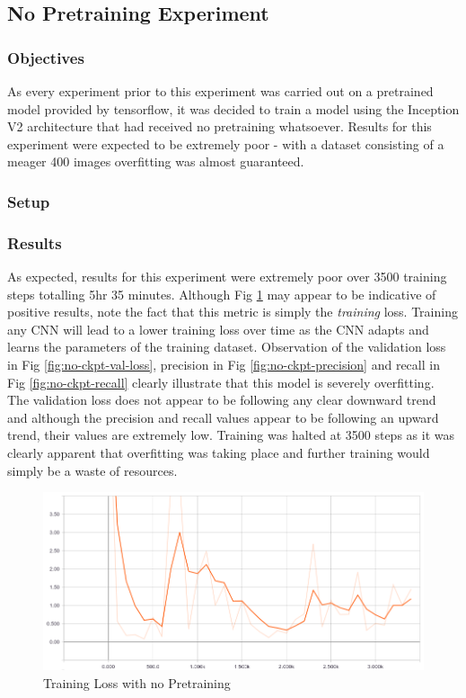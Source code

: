 \documentclass[12pt]{report}
\begin{document}
\newpage
\subsection{No Pretraining Experiment}
\subsubsection{Objectives}
\begin{flushleft}
As every experiment prior to this experiment was carried out on a pretrained model provided by tensorflow, it was decided to train a model using the Inception V2 architecture that had received no pretraining whatsoever. Results for this experiment were expected to be extremely poor - with a dataset consisting of a meager 400 images overfitting was almost guaranteed.
\end{flushleft}

\subsubsection{Setup}

\newpage
\subsubsection{Results}
\begin{flushleft}
As expected, results for this experiment were extremely poor over 3500 training steps totalling 5hr 35 minutes. Although Fig \ref{fig:no-ckpt-loss} may appear to be indicative of positive results, note the fact that this metric is simply the \textit{training} loss. Training any CNN will lead to a lower training loss over time as the CNN adapts and learns the parameters of the training dataset. Observation of the validation loss in Fig \ref{fig:no-ckpt-val-loss}, precision in Fig \ref{fig:no-ckpt-precision} and recall in Fig \ref{fig:no-ckpt-recall} clearly illustrate that this model is severely overfitting. The validation loss does not appear to be following any clear downward trend and although the precision and recall values appear to be following an upward trend, their values are extremely low. Training was halted at 3500 steps as it was clearly apparent that overfitting was taking place and further training would simply be a waste of resources.
\end{flushleft}

\vspace{0.5cm}
\begin{figure}[ht!]
	\centering
	\includegraphics[width=15cm]{no-ckpt-loss}
	\caption{Training Loss with no Pretraining}
	\label{fig:no-ckpt-loss}
\end{figure}
\end{document}
